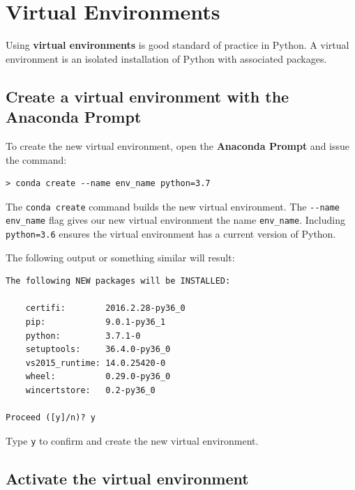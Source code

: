 \documentclass{book}
\begin{document}
    
        \section{Virtual Environments}\label{virtual-environments}
    




    
        Using \textbf{virtual environments} is good standard of practice in
Python. A virtual environment is an isolated installation of Python with
associated packages.
    




    
        \subsection{Create a virtual environment with the Anaconda
Prompt}\label{create-a-virtual-environment-with-the-anaconda-prompt}

To create the new virtual environment, open the \textbf{Anaconda Prompt}
and issue the command:

\begin{lstlisting}
> conda create --name env_name python=3.7
\end{lstlisting}

The \lstinline!conda create! command builds the new virtual environment.
The \lstinline!--name env_name! flag gives our new virtual environment
the name \lstinline!env_name!. Including \lstinline!python=3.6! ensures
the virtual environment has a current version of Python.

The following output or something similar will result:

\begin{lstlisting}
The following NEW packages will be INSTALLED:

    certifi:        2016.2.28-py36_0
    pip:            9.0.1-py36_1
    python:         3.7.1-0
    setuptools:     36.4.0-py36_0
    vs2015_runtime: 14.0.25420-0
    wheel:          0.29.0-py36_0
    wincertstore:   0.2-py36_0

Proceed ([y]/n)? y
\end{lstlisting}

Type \lstinline!y! to confirm and create the new virtual environment.
    




    
        \subsection{Activate the virtual
environment}\label{activate-the-virtual-environment}
\end{document}
